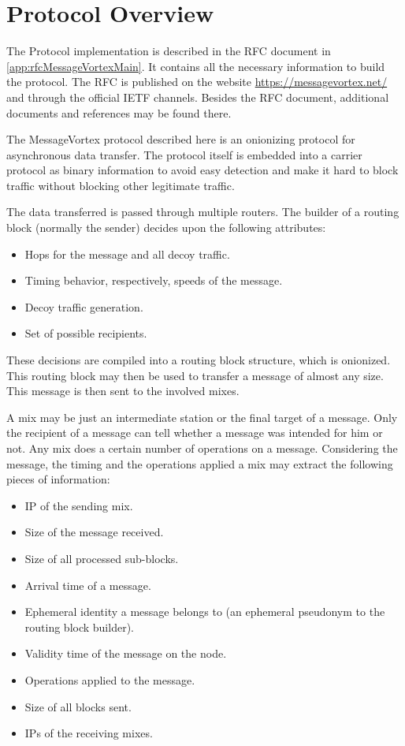 \chapter{Protocol Overview}
The Protocol implementation is described in the RFC document in \ref{app:rfcMessageVortexMain}. It contains all the necessary information to build the protocol. The RFC is published on the website \url{https://messagevortex.net/} and through the official IETF channels. Besides the RFC document, additional documents and references may be found there.

The MessageVortex protocol described here is an onionizing protocol for asynchronous data transfer. The protocol itself is embedded into a carrier protocol as binary information to avoid easy detection and make it hard to block traffic without blocking other legitimate traffic.

The data transferred is passed through multiple routers. The builder of a routing block (normally the sender) decides upon the following attributes:
\begin{itemize}
	\item Hops for the message and all decoy traffic.
	\item Timing behavior, respectively, speeds of the message.
	\item Decoy traffic generation.
	\item Set of possible recipients.
\end{itemize}

These decisions are compiled into a routing block structure, which is onionized. This routing block may then be used to transfer a message of almost any size. This message is then sent to the involved mixes.

A mix may be just an intermediate station or the final target of a message. Only the recipient of a message can tell whether a message was intended for him or not. Any mix does a certain number of operations on a message. Considering the message, the timing and the operations applied a mix may extract the following pieces of information:

\begin{itemize}
	\item IP of the sending mix.
	\item Size of the message received.
	\item Size of all processed sub-blocks.
	\item Arrival time of a message.
	\item Ephemeral identity a message belongs to (an ephemeral pseudonym to the routing block builder).
	\item Validity time of the message on the node.
	\item Operations applied to the message.
	\item Size of all blocks sent.
	\item IPs of the receiving mixes.
\end{itemize}


